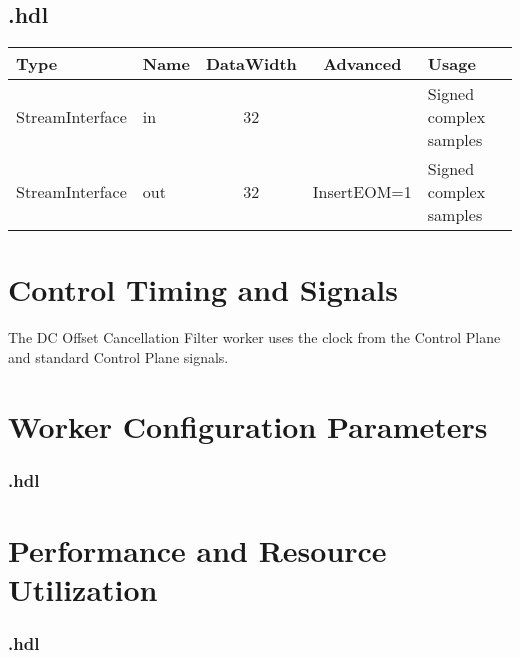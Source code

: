 \begin{landscape}
\subsection*{\comp.hdl}
\begin{scriptsize}
	\begin{tabular}{|M{2cm}|M{1.5cm}|c|c|M{10cm}|}
		\hline
		Type            & Name & DataWidth & Advanced                & Usage                  \\
		\hline
		StreamInterface & in   & 32        & & Signed complex samples \\
		\hline
		StreamInterface & out  & 32        & InsertEOM=1 & Signed complex samples \\
		\hline
	\end{tabular}
\end{scriptsize}
\end{landscape}

\section*{Control Timing and Signals}
\begin{flushleft}
The DC Offset Cancellation Filter worker uses the clock from the Control Plane and standard Control Plane signals.
\end{flushleft}

\begin{landscape}
\section*{Worker Configuration Parameters}
\subsubsection*{\comp.hdl}
%
\section*{Performance and Resource Utilization}
\subsubsection*{\comp.hdl}
%
\end{landscape}

